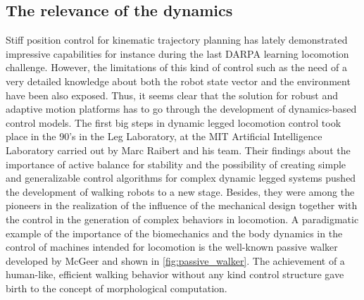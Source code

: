 \subsection{The relevance of the dynamics} %
\label{sub:dynamics_control}
Stiff position control for kinematic trajectory planning has lately demonstrated impressive capabilities for instance during the last DARPA learning locomotion challenge.
However, the limitations of this kind of control such as the need of a very detailed knowledge  about both the robot state vector and the environment have been also exposed.
Thus, it seems clear that the solution for robust and adaptive motion platforms has to go through the development of dynamics-based control models.
The first big steps in dynamic legged locomotion control took place in the 90's in the Leg Laboratory, at the MIT Artificial Intelligence Laboratory carried out by Marc Raibert and his team.
Their findings about the importance of active balance for stability and the possibility of creating simple and generalizable control algorithms for complex dynamic legged systems \cite{mit_leg_lab1} pushed the development of walking robots to a new stage.
Besides, they were among the pioneers in the realization of the influence of the mechanical design together with the control in the generation of complex behaviors in locomotion.
A paradigmatic example of the importance of the biomechanics and the body dynamics in the control of machines intended for locomotion is the well-known passive walker developed by McGeer \cite{passive_walking} and shown in \ref{fig:passive_walker}. 
The achievement of a human-like, efficient walking behavior without any kind control structure gave birth to the concept of morphological computation.

